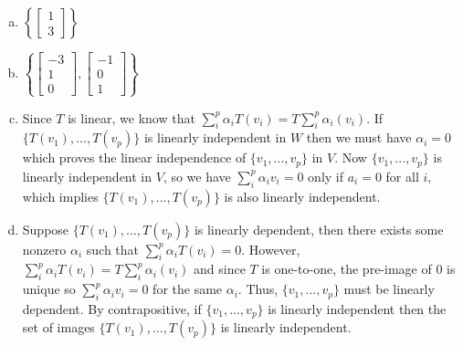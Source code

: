 \documentclass[11pt]{article}
\newenvironment{solution}{\begin{mdframed}[skipabove=\baselineskip,innertopmargin=\baselineskip,innerbottommargin=\baselineskip]
  }{\end{mdframed}}
\begin{document}
\begin{solution}
\begin{enumerate}[(a)]
    \item $\left\{ 
    \begin{bmatrix}
    1 \\ 3
    \end{bmatrix}
    \right\}$
    \item $\left\{ 
    \begin{bmatrix}
    -3 \\ 1 \\ 0
    \end{bmatrix}, \begin{bmatrix}
    -1 \\ 0 \\ 1
    \end{bmatrix}
    \right\}$
    \item Since $T$ is linear, we know that $\sum_i^p \alpha_i T(v_i) = T\sum_i^p \alpha_i (v_i)$. If $\{T(v_1),...,T(v_p)\}$ is linearly independent in $W$ then we must have $\alpha_i = 0$ which proves the linear independence of $\{v_1,...,v_p\}$ in $V$. Now $\{v_1,...,v_p\}$ is linearly independent in $V$, so we have $\sum_i^p \alpha_iv_i = 0$ only if $a_i = 0 $ for all $i$, which implies $\{T(v_1),...,T(v_p)\}$ is also linearly independent.
    \item Suppose $\{T(v_1),...,T(v_p)\}$ is linearly dependent, then there exists some nonzero $\alpha_i$ such that $\sum_i^p \alpha_i T(v_i) = 0$. However, $\sum_i^p \alpha_i T(v_i) = T\sum_i^p \alpha_i (v_i)$ and since $T$ is one-to-one, the pre-image of 0 is unique so $\sum_i^p \alpha_i v_i = 0$ for the same $\alpha_i$. Thus, $\{v_1,...,v_p\}$ must be linearly dependent. By contrapositive, if $\{v_1,...,v_p\}$ is linearly independent then the set of images $\{T(v_1),...,T(v_p)\}$ is linearly independent. \\
    
\end{enumerate}
\end{solution}

\vspace{3em}
\end{document}
